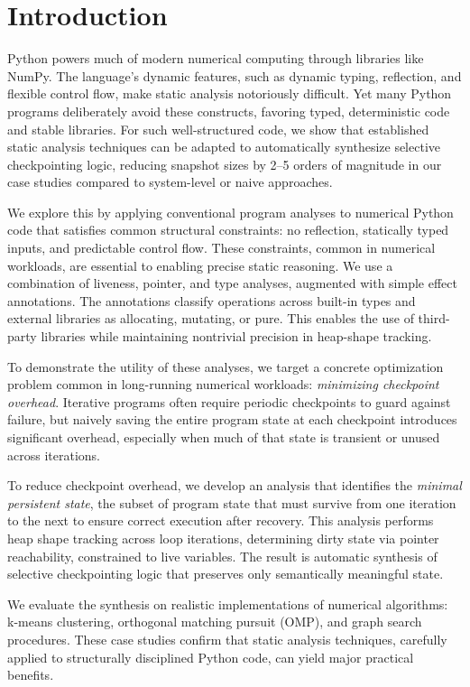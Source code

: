 \section{Introduction}
Python powers much of modern numerical computing through libraries like NumPy. The language’s dynamic features, such as dynamic typing, reflection, and flexible control flow, make static analysis notoriously difficult. Yet many Python programs deliberately avoid these constructs, favoring typed, deterministic code and stable libraries. For such well-structured code, we show that established static analysis techniques can be adapted to automatically synthesize selective checkpointing logic, reducing snapshot sizes by 2–5 orders of magnitude in our case studies compared to system-level or naive approaches.

We explore this by applying conventional program analyses to numerical Python code that satisfies common structural constraints: no reflection, statically typed inputs, and predictable control flow. These constraints, common in numerical workloads, are essential to enabling precise static reasoning. We use a combination of liveness, pointer, and type analyses, augmented with simple effect annotations. The annotations classify operations across built-in types and external libraries as allocating, mutating, or pure. This enables the use of third-party libraries while maintaining nontrivial precision in heap-shape tracking.

To demonstrate the utility of these analyses, we target a concrete optimization problem common in long-running numerical workloads: \emph{minimizing checkpoint overhead}. Iterative programs often require periodic checkpoints to guard against failure, but naively saving the entire program state at each checkpoint introduces significant overhead, especially when much of that state is transient or unused across iterations.

To reduce checkpoint overhead, we develop an analysis that identifies the \emph{minimal persistent state}, the subset of program state that must survive from one iteration to the next to ensure correct execution after recovery. This analysis performs heap shape tracking across loop iterations, determining dirty state via pointer reachability, constrained to live variables. The result is automatic synthesis of selective checkpointing logic that preserves only semantically meaningful state.

We evaluate the synthesis on realistic implementations of numerical algorithms: k-means clustering, orthogonal matching pursuit (OMP), and graph search procedures. These case studies confirm that static analysis techniques, carefully applied to structurally disciplined Python code, can yield major practical benefits.

